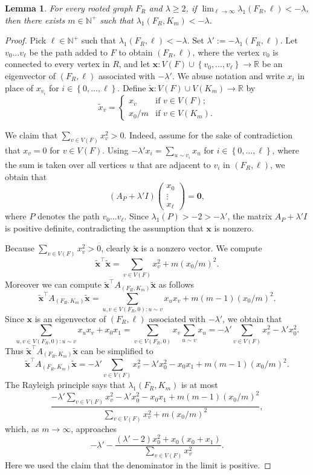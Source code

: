\documentclass[11pt]{article}
\newtheorem{lemma}[theorem]{Lemma}
\theoremstyle{definition}
\theoremstyle{remark}
\newcommand{\sset}[1]{\left\{{#1}\right\}}
\newcommand{\la}{\lambda}
\newcommand{\N}{\mathbb{N}}
\newcommand{\R}{\mathbb{R}}
\newcommand{\bx}{\bm{x}}
\newcommand{\tbx}{\tilde{\bm{x}}}
\newcommand{\T}{\intercal}
\begin{document}
\begin{lemma} \label{lem:clique-extension}
    For every rooted graph $F_R$ and $\la \ge 2$, if $\lim_{\ell\to\infty} \la_1(F_R, \ell) < -\la$, then there exists $m \in \N^+$ such that $\la_1(F_R, K_m) < -\la$.
\end{lemma}
\begin{proof}
    Pick $\ell \in \N^+$ such that $\la_1(F_R, \ell) < -\la$. Set $\la' := -\la_1(F_R, \ell)$. Let $v_0\dots v_\ell$ be the path added to $F$ to obtain $(F_R, \ell)$, where the vertex $v_0$ is connected to every vertex in $R$, and let $\bx\colon V(F) \cup \sset{v_0, \dots, v_\ell} \to \R$ be an eigenvector of $(F_R, \ell)$ associated with $-\la'$. We abuse notation and write $x_i$ in place of $x_{v_i}$ for $i \in \sset{0,\dots, \ell}$. Define $\tbx \colon V(F) \cup V(K_m) \to \R$ by
    \[
        \tilde{x}_v = \begin{cases}
            x_v & \text{if }v \in V(F); \\
            x_0/m  & \text{if }v \in V(K_m).
        \end{cases}
    \]

    We claim that $\sum_{v \in V(F)}x_v^2 > 0$. Indeed, assume for the sake of contradiction that $x_v = 0$ for $v \in V(F)$. Using $-\la' x_i = \sum_{u\sim v_i}x_u$ for $i \in \sset{0, \dots, \ell}$, where the sum is taken over all vertices $u$ that are adjacent to $v_i$ in $(F_R, \ell)$, we obtain that \[
        (A_P + \la' I)\begin{pmatrix}
            x_0 \\
            \vdots \\
            x_\ell
        \end{pmatrix} = \bm{0},
    \]
    where $P$ denotes the path $v_0\dots v_\ell$. Since $\la_1(P) > -2 > -\la'$, the matrix $A_P + \la' I$ is positive definite, contradicting the assumption that $\bx$ is nonzero.

    Because $\sum_{v \in V(F)}x_v^2 > 0$, clearly $\tbx$ is a nonzero vector. We compute
    \[
        \tbx^\T \tbx = \sum_{v \in V(F)}x_v^2 + m(x_0/m)^2.
    \]
    Moreover we can compute $\tbx^\T A_{(F_R, K_m)}\tbx$ as follows
    \[
        \tbx^\T A_{(F_R, K_m)}\tbx = \sum_{u,v \in V(F_R, 0)\colon u\sim v}x_ux_v + m(m-1)(x_0/m)^2.
    \]
    Since $\bx$ is an eigenvector of $(F_R, \ell)$ associated with $-\la'$, we obtain that
    \[
        \sum_{u, v \in V(F_R, 0)\colon u\sim v} x_ux_v + x_0x_1 = \sum_{v \in V(F_R, 0)}x_v \sum_{u\sim v}x_u = -\la'\sum_{v \in V(F)}x_v^2 - \la' x_0^2.
    \]
    Thus $\tbx^\T A_{(F_R, K_m)}\tbx$ can be simplified to
    \[
        \tbx^\T A_{(F_R, K_m)}\tbx = -\la'\sum_{v \in V(F)}x_v^2 -\la'x_0^2 - x_0x_1 + m(m-1)(x_0/m)^2.
    \]
    The Rayleigh principle says that $\la_1(F_R, K_m)$ is at most
    \[
        \frac{-\la'\sum_{v \in V(F)}x_v^2 - \la'x_0^2 - x_0x_1 + m(m-1)(x_0/m)^2}{\sum_{v \in V(F)}x_v^2 + m(x_0/m)^2},
    \]
    which, as $m\to\infty$, approaches
    \[
        -\la' - \frac{(\la'-2)x_0^2+x_0(x_0 + x_1)}{\sum_{v \in V(F)}x_v^2}.
    \]
    Here we used the claim that the denominator in the limit is positive.


\end{proof}
\end{document}
